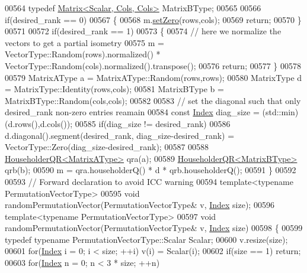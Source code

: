 \begin{DoxyCode}
00564   \textcolor{keyword}{typedef} \hyperlink{group___core___module_class_eigen_1_1_matrix}{Matrix<Scalar, Cols, Cols>} MatrixBType;
00565 
00566   \textcolor{keywordflow}{if}(desired\_rank == 0)
00567   \{
00568     m.\hyperlink{class_eigen_1_1_plain_object_base_ac21ad5f989f320e46958b75ac8d9a1da}{setZero}(rows,cols);
00569     \textcolor{keywordflow}{return};
00570   \}
00571 
00572   \textcolor{keywordflow}{if}(desired\_rank == 1)
00573   \{
00574     \textcolor{comment}{// here we normalize the vectors to get a partial isometry}
00575     m = VectorType::Random(rows).normalized() * VectorType::Random(cols).normalized().transpose();
00576     \textcolor{keywordflow}{return};
00577   \}
00578 
00579   MatrixAType a = MatrixAType::Random(rows,rows);
00580   MatrixType d = MatrixType::Identity(rows,cols);
00581   MatrixBType  b = MatrixBType::Random(cols,cols);
00582 
00583   \textcolor{comment}{// set the diagonal such that only desired\_rank non-zero entries reamain}
00584   \textcolor{keyword}{const} \hyperlink{namespace_eigen_a62e77e0933482dafde8fe197d9a2cfde}{Index} diag\_size = (std::min)(d.rows(),d.cols());
00585   \textcolor{keywordflow}{if}(diag\_size != desired\_rank)
00586     d.diagonal().segment(desired\_rank, diag\_size-desired\_rank) = VectorType::Zero(diag\_size-desired\_rank);
00587 
00588   \hyperlink{group___q_r___module_class_eigen_1_1_householder_q_r}{HouseholderQR<MatrixAType>} qra(a);
00589   \hyperlink{group___q_r___module_class_eigen_1_1_householder_q_r}{HouseholderQR<MatrixBType>} qrb(b);
00590   m = qra.householderQ() * d * qrb.householderQ();
00591 \}
00592 
00593 \textcolor{comment}{// Forward declaration to avoid ICC warning}
00594 \textcolor{keyword}{template}<\textcolor{keyword}{typename} PermutationVectorType>
00595 \textcolor{keywordtype}{void} randomPermutationVector(PermutationVectorType& v, \hyperlink{namespace_eigen_a62e77e0933482dafde8fe197d9a2cfde}{Index} size);
00596 \textcolor{keyword}{template}<\textcolor{keyword}{typename} PermutationVectorType>
00597 \textcolor{keywordtype}{void} randomPermutationVector(PermutationVectorType& v, \hyperlink{namespace_eigen_a62e77e0933482dafde8fe197d9a2cfde}{Index} size)
00598 \{
00599   \textcolor{keyword}{typedef} \textcolor{keyword}{typename} PermutationVectorType::Scalar Scalar;
00600   v.resize(size);
00601   \textcolor{keywordflow}{for}(\hyperlink{namespace_eigen_a62e77e0933482dafde8fe197d9a2cfde}{Index} i = 0; i < size; ++i) v(i) = Scalar(i);
00602   \textcolor{keywordflow}{if}(size == 1) \textcolor{keywordflow}{return};
00603   \textcolor{keywordflow}{for}(\hyperlink{namespace_eigen_a62e77e0933482dafde8fe197d9a2cfde}{Index} n = 0; n < 3 * size; ++n)

\end{DoxyCode}

